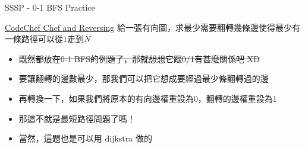 \documentclass[aspectratio=169]{beamer}
\begin{document}
    \begin{frame}{SSSP - 0-1 BFS Practice}
        \begin{block}{\href{https://www.codechef.com/problems/REVERSE}{CodeChef Chef and Reversing}}
        給一張有向圖，求最少需要翻轉幾條邊使得最少有一條路徑可以從$1$走到$N$
        \end{block}
        \begin{itemize}
            \item<2-> \sout{既然都放在0-1 BFS的例題了，那就想想它跟0/1有甚麼關係吧 XD}
            \item<3-> 要讓翻轉的邊數最少，那我們可以把它想成要經過最少條翻轉過的邊
            \item<4-> 再轉換一下，如果我們將原本的有向邊權重設為0，翻轉的邊權重設為1
            \item<5-> 那這不就是最短路徑問題了嗎！
            \item<6-> 當然，這題也是可以用 dijkstra 做的
        \end{itemize}
    \end{frame}
    
\end{document}
